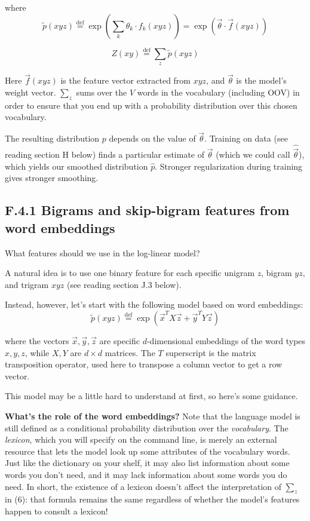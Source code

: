 where  
\begin{equation}
\tilde{p}(xyz) \overset{\text{def}}{=} \exp\left(\sum_k \theta_k \cdot f_k(xyz)\right) = \exp\left(\vec{\theta} \cdot \vec{f}(xyz)\right)
\end{equation}  

\begin{equation}
Z(xy) \overset{\text{def}}{=} \sum_z \tilde{p}(xyz)
\end{equation}  

Here $\vec{f}(xyz)$ is the feature vector extracted from $xyz$, and $\vec{\theta}$ is the model’s weight vector. $\sum_z$ sums over the 
$V$ words in the vocabulary (including OOV) in order to ensure that you end up with a probability distribution 
over this chosen vocabulary.  

The resulting distribution $p$ depends on the value of $\vec{\theta}$. Training on data (see reading section H below) 
finds a particular estimate of $\vec{\theta}$ (which we could call $\hat{\vec{\theta}}$), which yields our smoothed distribution $\hat{p}$. Stronger 
regularization during training gives stronger smoothing.  

\subsection*{F.4.1 \quad Bigrams and skip-bigram features from word embeddings}

What features should we use in the log-linear model?  

A natural idea is to use one binary feature for each specific unigram $z$, bigram $yz$, and trigram $xyz$ (see 
reading section J.3 below).  

Instead, however, let’s start with the following model based on word embeddings:  
\begin{equation}
\tilde{p}(xyz) \overset{\text{def}}{=} \exp\left(\vec{x}^T X \vec{z} + \vec{y}^T Y \vec{z}\right)
\end{equation}  

where the vectors $\vec{x}, \vec{y}, \vec{z}$ are specific $d$-dimensional embeddings of the word types $x, y, z$, while $X, Y$ are 
$d \times d$ matrices. The $T$ superscript is the matrix transposition operator, used here to transpose a column 
vector to get a row vector.  

This model may be a little hard to understand at first, so here’s some guidance.  

\textbf{What’s the role of the word embeddings?} Note that the language model is still defined as a conditional 
probability distribution over the \textit{vocabulary}. The \textit{lexicon}, which you will specify on the command line, 
is merely an external resource that lets the model look up some attributes of the vocabulary words. Just 
like the dictionary on your shelf, it may also list information about some words you don’t need, and it 
may lack information about some words you do need. In short, the existence of a lexicon doesn’t affect 
the interpretation of $\sum_z$ in (6): that formula remains the same regardless of whether the model’s features 
happen to consult a lexicon!  

